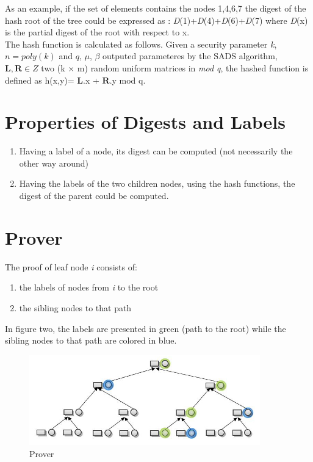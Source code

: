 \documentclass[11pt, letterpaper, oneside]{article}
\begin{document}
	
	As an example, if the set of elements contains the nodes {1,4,6,7} the digest of the hash root of the tree 
	could be expressed as : \textit{D}(1)+\textit{D}(4)+\textit{D}(6)+\textit{D}(7)
        where \textit{D}(x) is the partial digest of the root with respect to x. \\
	
	The hash function is calculated as follows. Given a security parameter \textit{k}, $\textit{n} = 
	poly(\textit{k})$ and $\textit{q} $, $\textit{$\mu$}$, $\textit{$\beta$}$ outputed parameteres by the SADS 
	algorithm, $\textbf{L}, \textbf{R} \in Z $ two (k $\times$ m) random uniform matrices in \textit{mod q}, the 
	hashed function is defined as h(x,y)= $\textbf{L}$.x + $\textbf{R}$.y mod q. \\ 
	
	\section{Properties of Digests and Labels}
	
	\begin{enumerate}
	\item Having a label of a node, its digest can be computed (not necessarily the other way around)
	\item Having the labels of the two children nodes, using the hash functions, the digest of the parent
	      could be computed.
	\end{enumerate}
	
	\section{Prover}
	
	The proof of leaf node \textit{i} consists of: 
	\begin{enumerate}
	 \item the labels of nodes from \textit{i} to the root
	 \item the sibling nodes to that path
	\end{enumerate}
	
	In figure two, the labels are presented in green (path to the root) while the sibling
	nodes to that path are colored in blue. 

	\begin{figure}[h]
        \centering
        \includegraphics[width=100mm]{./images/8.jpg}
        \caption[]{Prover}
        \end{figure}
	
\end{document}
